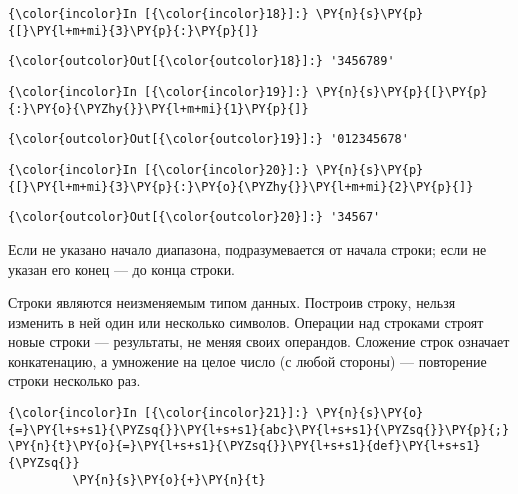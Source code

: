     \begin{Verbatim}[commandchars=\\\{\}]
{\color{incolor}In [{\color{incolor}18}]:} \PY{n}{s}\PY{p}{[}\PY{l+m+mi}{3}\PY{p}{:}\PY{p}{]}
\end{Verbatim}

            \begin{Verbatim}[commandchars=\\\{\}]
{\color{outcolor}Out[{\color{outcolor}18}]:} '3456789'
\end{Verbatim}
        
    \begin{Verbatim}[commandchars=\\\{\}]
{\color{incolor}In [{\color{incolor}19}]:} \PY{n}{s}\PY{p}{[}\PY{p}{:}\PY{o}{\PYZhy{}}\PY{l+m+mi}{1}\PY{p}{]}
\end{Verbatim}

            \begin{Verbatim}[commandchars=\\\{\}]
{\color{outcolor}Out[{\color{outcolor}19}]:} '012345678'
\end{Verbatim}
        
    \begin{Verbatim}[commandchars=\\\{\}]
{\color{incolor}In [{\color{incolor}20}]:} \PY{n}{s}\PY{p}{[}\PY{l+m+mi}{3}\PY{p}{:}\PY{o}{\PYZhy{}}\PY{l+m+mi}{2}\PY{p}{]}
\end{Verbatim}

            \begin{Verbatim}[commandchars=\\\{\}]
{\color{outcolor}Out[{\color{outcolor}20}]:} '34567'
\end{Verbatim}
        
    Если не указано начало диапазона, подразумевается от начала строки; если
не указан его конец --- до конца строки.

Строки являются неизменяемым типом данных. Построив строку, нельзя
изменить в ней один или несколько символов. Операции над строками строят
новые строки --- результаты, не меняя своих операндов. Сложение строк
означает конкатенацию, а умножение на целое число (с любой стороны) ---
повторение строки несколько раз.

    \begin{Verbatim}[commandchars=\\\{\}]
{\color{incolor}In [{\color{incolor}21}]:} \PY{n}{s}\PY{o}{=}\PY{l+s+s1}{\PYZsq{}}\PY{l+s+s1}{abc}\PY{l+s+s1}{\PYZsq{}}\PY{p}{;} \PY{n}{t}\PY{o}{=}\PY{l+s+s1}{\PYZsq{}}\PY{l+s+s1}{def}\PY{l+s+s1}{\PYZsq{}}
         \PY{n}{s}\PY{o}{+}\PY{n}{t}
\end{Verbatim}


